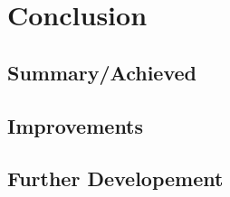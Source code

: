 \chapter{Conclusion}
\label{sec:conclusion}

\section{Summary/Achieved}
\label{sec:summary}
\section{Improvements}
\label{sec:improvements}
\section{Further Developement}
\label{sec:future_work}

